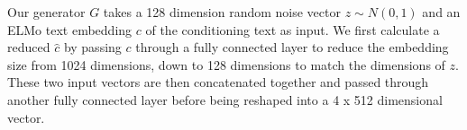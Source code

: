 Our generator $G$ takes a 128 dimension random noise vector $z \sim N(0, 1)$ and an ELMo text embedding $c$ of the conditioning text as input. We first calculate a reduced  $\hat{c}$ by passing $c$ through a fully connected layer to reduce the embedding size from 1024 dimensions, down to 128 dimensions to match the dimensions of $z$. These two input vectors are then concatenated together and passed through another fully connected layer before being reshaped into a 4 x 512 dimensional vector.